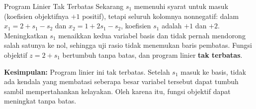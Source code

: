 \begin{example}{Program Linier Tak Terbatas}
\noindent Sekarang $s_1$ memenuhi syarat untuk masuk (koefisien objektifnya $+1$ positif), tetapi seluruh kolomnya nonnegatif: dalam $x_1 = 2 + s_1 - s_2$ dan $x_2 = 1 + 2s_1 - s_2$, koefisien $s_1$ adalah $+1$ dan $+2$. Meningkatkan $s_1$ menaikkan kedua variabel basis dan tidak pernah mendorong salah satunya ke nol, sehingga uji rasio tidak menemukan baris pembatas. Fungsi objektif $z = 2 + s_1$ bertumbuh tanpa batas, dan program linier \textbf{tak terbatas}.

\textbf{Kesimpulan:}  
Program linier ini tak terbatas. Setelah \( s_1 \) masuk ke basis, tidak ada kendala yang membatasi seberapa besar variabel tersebut dapat tumbuh sambil mempertahankan kelayakan. Oleh karena itu, fungsi objektif dapat meningkat tanpa batas.
\end{example}

